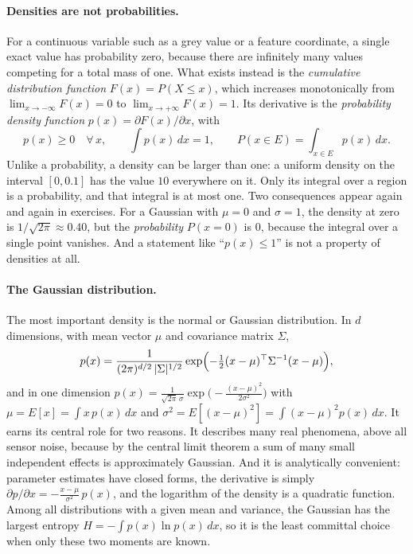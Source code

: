 \paragraph{Densities are not probabilities.}
For a continuous variable such as a grey value or a feature coordinate, a single
exact value has probability zero, because there are infinitely many values
competing for a total mass of one. What exists instead is the
\emph{cumulative distribution function} $F(x) = P(X\le x)$, which increases
monotonically from $\lim_{x\to-\infty}F(x) = 0$ to $\lim_{x\to+\infty}F(x) = 1$.
Its derivative is the \emph{probability density function}
$p(x) = \partial F(x)/\partial x$, with
\begin{equation}
  p(x)\ge 0 \quad\forall\,x,
  \qquad
  \int p(x)\,dx = 1,
  \qquad
  P(x\in E) = \int_{x\in E} p(x)\,dx .
\end{equation}
\noindent
Unlike a probability, a density can be larger than one: a uniform density on the
interval $[0,0.1]$ has the value $10$ everywhere on it. Only its integral over a
region is a probability, and that integral is at most one. Two consequences
appear again and again in exercises. For a Gaussian with $\mu=0$ and $\sigma=1$,
the density at zero is $1/\sqrt{2\pi}\approx 0.40$, but the \emph{probability}
$P(x=0)$ is $0$, because the integral over a single point vanishes. And a
statement like ``$p(x)\le 1$'' is not a property of densities at all.

\paragraph{The Gaussian distribution.}
The most important density is the normal or Gaussian distribution. In $d$
dimensions, with mean vector $\mu$ and covariance matrix $\Sigma$,
\begin{equation}
  p(x) = \frac{1}{(2\pi)^{d/2}\,\lvert\Sigma\rvert^{1/2}}
  \exp\Bigl(-\tfrac{1}{2}(x-\mu)^\top\Sigma^{-1}(x-\mu)\Bigr),
  \label{eq:gauss-nd}
\end{equation}
\noindent
and in one dimension
$p(x) = \frac{1}{\sqrt{2\pi}\,\sigma}\exp\bigl(-\frac{(x-\mu)^2}{2\sigma^2}\bigr)$
with $\mu = E[x] = \int x\,p(x)\,dx$ and
$\sigma^2 = E[(x-\mu)^2] = \int (x-\mu)^2 p(x)\,dx$. It earns its central role
for two reasons. It describes many real phenomena, above all sensor noise,
because by the central limit theorem a sum of many small independent effects is
approximately Gaussian. And it is analytically convenient: parameter estimates
have closed forms, the derivative is simply
$\partial p/\partial x = -\frac{x-\mu}{\sigma^2}\,p(x)$, and the logarithm of the
density is a quadratic function. Among all distributions with a given mean and
variance, the Gaussian has the largest entropy
$H = -\int p(x)\ln p(x)\,dx$, so it is the least committal choice when only
these two moments are known.

